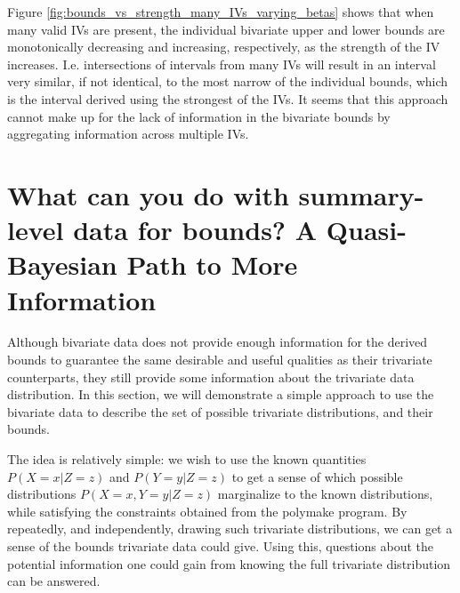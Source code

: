 \documentclass[
]{article}
\providecommand{\tightlist}{%
  \setlength{\itemsep}{0pt}\setlength{\parskip}{0pt}}
\theoremstyle{plain}
\begin{document}
Figure \ref{fig:bounds_vs_strength_many_IVs_varying_betas} shows that when many valid IVs are present, the individual bivariate upper and lower bounds are monotonically decreasing and increasing, respectively, as the strength of the IV increases. I.e. intersections of intervals from many IVs will result in an interval very similar, if not identical, to the most narrow of the individual bounds, which is the interval derived using the strongest of the IVs. It seems that this approach cannot make up for the lack of information in the bivariate bounds by aggregating information across multiple IVs.

\iffalse

\begin{itemize}
\tightlist
\item
  Marginalize from logistic regression with multiple IVs, both constant and varying coefficients.
  \emph{When coefficients constant, all intervals are (not surprisingly) identical. In a logistic model, many IVs present =\textgreater{} weak.
  }When coefficients not constant, strength varies, but again, when many IVs present, IVs are weak.
  *When many IVs available, and distribution of \(Z_j\) as in MR (i.e.~approximately \(P(Z_j = 0) = 0.25, P(Z_j = 1) = 0.50, P(Z_j = 2) = 0.25\)), gains from intersections of multiple bounds is miniscule.
\end{itemize}

\fi

\hypertarget{what-can-you-do-with-summary-level-data-for-bounds-a-quasi-bayesian-path-to-more-information}{%
\section{What can you do with summary-level data for bounds? A Quasi-Bayesian Path to More Information}\label{what-can-you-do-with-summary-level-data-for-bounds-a-quasi-bayesian-path-to-more-information}}

\label{quasi-bayesian}

Although bivariate data does not provide enough information for the derived bounds to guarantee the same desirable and useful qualities as their trivariate counterparts, they still provide some information about the trivariate data distribution. In this section, we will demonstrate a simple approach to use the bivariate data to describe the set of possible trivariate distributions, and their bounds.

The idea is relatively simple: we wish to use the known quantities \(P(X = x | Z = z)\) and \(P(Y = y | Z = z)\) to get a sense of which possible distributions \(P(X = x, Y = y | Z = z)\) marginalize to the known distributions, while satisfying the constraints obtained from the polymake program. By repeatedly, and independently, drawing such trivariate distributions, we can get a sense of the bounds trivariate data could give. Using this, questions about the potential information one could gain from knowing the full trivariate distribution can be answered.
\end{document}
